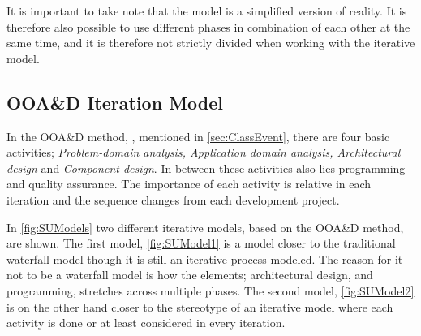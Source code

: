 It is important to take note that the model is a simplified version of reality.
It is therefore also possible to use different phases in combination of each other at the same time, and it is therefore not strictly divided when working with the iterative model.

\subsection{OOA\&D Iteration Model}\label{sec:Iterative3}
In the OOA\&D method, \cite{Rod-Aalborg}, mentioned in \cref{sec:ClassEvent}, there are four basic activities; \textit{Problem-domain analysis, Application domain analysis, Architectural design} and \textit{Component design}.
In between these activities also lies programming and quality assurance.
The importance of each activity is relative in each iteration and the sequence changes from each development project.

In \cref{fig:SUModels} two different iterative models, based on the OOA\&D method, are shown.
The first model, \cref{fig:SUModel1} is a model closer to the traditional waterfall model though it is still an iterative process modeled.
The reason for it not to be a waterfall model is how the elements; architectural design, and programming, stretches across multiple phases.
The second model, \cref{fig:SUModel2} is on the other hand closer to the stereotype of an iterative model where each activity is done or at least considered in every iteration. 

